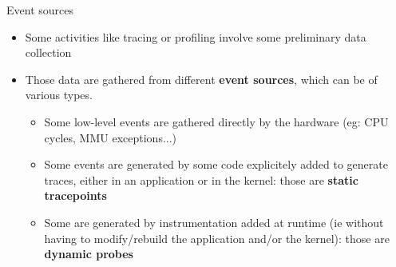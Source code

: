 \begin{frame}{Event sources}
  \begin{itemize}
    \item Some activities like tracing or profiling involve some preliminary
      data collection
    \item Those data are gathered from different \textbf{event sources}, which
      can be of various types.
      \begin{itemize}
        \item Some low-level events are gathered directly by the hardware (eg:
          CPU cycles, MMU exceptions...)
        \item Some events are generated by some code explicitely added to
          generate traces,
          either in an application or in the
          kernel: those are \textbf{static
          tracepoints}
        \item Some are generated by instrumentation
          added at runtime (ie without
          having to modify/rebuild the
          application and/or the kernel):
          those are \textbf{dynamic probes}
      \end{itemize}
  \end{itemize}
\end{frame}
